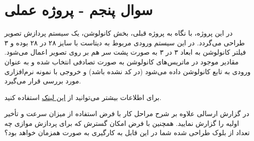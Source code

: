 \section{سوال پنجم - پروژه عملی}

در این پروژه، با نگاه به پروژه قبلی، بخش کانولوشن، یک سیستم پردازش تصویر طراحی می‌گردد. در این سیستم ورودی مربوط به دیتاست  با سایز ۲۸ در ۲۸ بوده و ۳ فیلتر کانولوشن به ابعاد ۳ در ۳ به صورت پشت سر هم بر روی تصویر اعمال می‌شود. مقادیر موجود در ماتریس‌های کانولوشن به صورت تصادفی انتخاب شده و به عنوان ورودی به تابع کانولوشن داده می‌شود (در کد  نشده باشد) و خروجی با نمونه نرم‌افزاری مورد بررسی قرار می‌گیرد.

برای اطلاعات بیشتر می‌توانید از
\href{https://serokell.io/blog/introduction-to-convolutional-neural-networks}{این لینک}
استفاده کنید.

در گزارش ارسالی علاوه بر شرح مراحل کار با فرض استفاده از  میزان سرعت و تأخیر اولیه را گزارش نمایید. همچنین با فرض امکان گسترش که برای پردازش موازی چه تعداد از بلوک طراحی شده شما در این  قابل به کارگیری به صورت همزمان خواهد بود؟

